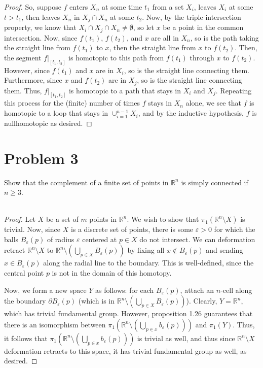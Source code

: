 \documentclass[fontsize=11pt]{scrartcl} %
\numberwithin{equation}{section} %
\numberwithin{figure}{section} %
\numberwithin{table}{section} %
\newcommand{\R}{\mathbb{R}}
\begin{document}
\begin{proof}
    So, suppose $f$ enters $X_n$ at
    some time $t_1$ from a set $X_i$, leaves $X_i$ at some $t>t_1$, then leaves
    $X_n$ in $X_j\cap X_n$ at some $t_2$. Now, by the triple intersection
    property, we know that $X_i\cap X_j\cap X_n \neq \emptyset$, so let $x$ be a
    point in the common intersection. Now, since $f(t_1)$, $f(t_2)$, and $x$ are
    all in $X_n$, so is the path taking the straight line from $f(t_1)$ to $x$,
    then the straight line from $x$ to $f(t_2)$. Then, the segment
    $f|_{[t_1,t_2]}$ is homotopic to this path from $f(t_1)$ through $x$ to
    $f(t_2)$. However, since $f(t_1)$ and $x$ are in $X_i$, so is the straight
    line connecting them. Furthermore, since $x$ and $f(t_2)$ are in $X_j$, so
    is the straight line connecting them. Thus, $f|_{[t_1,t_2]}$ is homotopic to
    a path that stays in $X_i$ and $X_j$. Repeating this process for the
    (finite) number of times $f$ stays in $X_n$ alone, we see that $f$ is
    homotopic to a loop that stays in $\cup_{i=1}^{n-1}X_i$, and by the
    inductive hypothesis, $f$ is nullhomotopic as desired.

\end{proof}

\newpage
\section*{Problem 3}
Show that the complement of a finite set of points in $\R^n$ is simply connected
if $n\geq 3$.
\\
\\
\begin{proof}
    Let $X$ be a set of $m$ points in $\R^n$. We wish to show that
    $\pi_1(\R^n\setminus X)$ is trivial. Now, since $X$ is a discrete set of
    points, there is some $\varepsilon>0$ for which the balls
    $B_{\varepsilon}(p)$ of radius $\varepsilon$ centered at $p\in X$ do not
    intersect. We can deformation retract $\R^n\setminus X$ to $\R^n\setminus
    (\bigcup_{p\in X}B_{\varepsilon}(p))$ by fixing all $x\not\in
    B_{\varepsilon}(p)$ and sending $x\in B_{\varepsilon}(p)$ along the radial
    line to the boundary. This is well-defined, since the central point $p$ is
    not in the domain of this homotopy.

    Now, we form a new space $Y$ as follows: for each $B_{\varepsilon}(p)$,
    attach an $n$-cell along the boundary $\partial B_{\varepsilon}(p)$ (which
    is in $\R^n\setminus(\bigcup_{p\in X}B_{\varepsilon}(p))$). Clearly, $Y =
    \R^n$, which has trivial fundamental group. However, proposition 1.26
    guarantees that there is an isomorphism between $\pi_1(\R^n\setminus
    (\bigcup_{p\in x}b_{\varepsilon}(p)))$ and $\pi_1(Y)$. Thus, it follows that
    $\pi_1(\R^n\setminus(\bigcup_{p\in x}b_{\varepsilon}(p)))$ is trivial as
    well, and thus since $\R^n\setminus X$ deformation retracts to this space,
    it has trivial fundamental group as well, as desired.
\end{proof}
\end{document}
